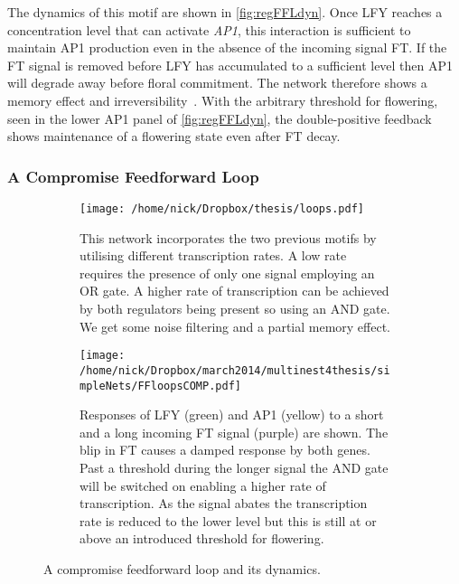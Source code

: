 The dynamics of this motif are shown in \autoref{fig:regFFLdyn}.
Once LFY reaches a concentration level that can activate \emph{AP1}, this interaction is sufficient to maintain AP1 production even in the absence of the incoming signal FT.
If the FT signal is removed before LFY has accumulated to a sufficient level then AP1 will degrade away before floral commitment.
The network therefore shows a memory effect and irreversibility~\cite{alon2006}.
With the arbitrary threshold for flowering, seen in the lower AP1 panel of \autoref{fig:regFFLdyn}, the double-positive feedback shows maintenance of a flowering state even after FT decay.

\subsubsection{A Compromise Feedforward Loop}

\begin{figure*}[!htb]
\centering
\begin{subfigure}[b]{0.42\linewidth}
\texttt{[image: /home/nick/Dropbox/thesis/loops.pdf]}
\caption{
This network incorporates the two previous motifs by utilising different transcription rates.
A low rate requires the presence of only one signal employing an OR gate.
A higher rate of transcription can be achieved by both regulators being present so using an AND gate.
We get some noise filtering and a partial memory effect.
}
\label{fig:compFFL}
\end{subfigure}
\begin{subfigure}[b]{0.56\linewidth}
\texttt{[image: /home/nick/Dropbox/march2014/multinest4thesis/simpleNets/FFloopsCOMP.pdf]}
\caption{%
Responses of LFY (green) and AP1 (yellow) to a short and a long incoming FT signal (purple) are shown.
The blip in FT causes a damped response by both genes.
Past a threshold during the longer signal the AND gate will be switched on enabling a higher rate of transcription.
As the signal abates the transcription rate is reduced to the lower level but this is still at or above an introduced threshold for flowering.
}
\label{fig:compFFLdyn}
\end{subfigure}
\captionsetup{justification=centering}
\caption{A compromise feedforward loop and its dynamics.}%
\end{figure*}

